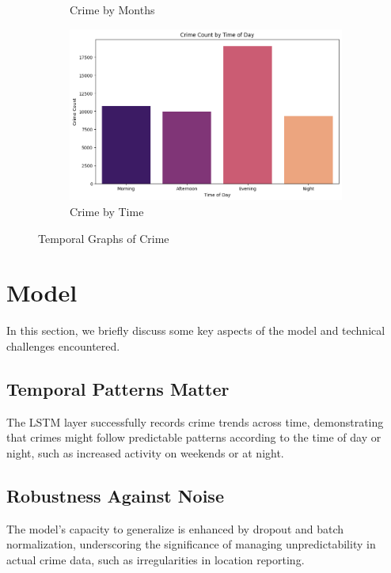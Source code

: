 \documentclass{article}
\begin{document}
\begin{figure}
\begin{subfigure}[b]{0.3\textwidth}
         \caption{Crime by Months}
         \label{fig:crime-location}
     \end{subfigure}
     \begin{subfigure}[b]{0.3\textwidth}
         \centering
         \includegraphics[width=\textwidth]{deep-learning-im/crime-time.png}
         \caption{Crime by Time}
         \label{fig:crime-location}
     \end{subfigure}
        \caption{Temporal Graphs of Crime}
        \label{fig:temporal}
\end{figure}

\section{Model}
In this section, we briefly discuss some key aspects of the model and technical challenges encountered. 

\subsection{Temporal Patterns Matter}
The LSTM layer successfully records crime trends across time, demonstrating that crimes might follow predictable patterns according to the time of day or night, such as increased activity on weekends or at night.

\subsection{Robustness Against Noise}
The model's capacity to generalize is enhanced by dropout and batch normalization, underscoring the significance of managing unpredictability in actual crime data, such as irregularities in location reporting.
\end{document}
